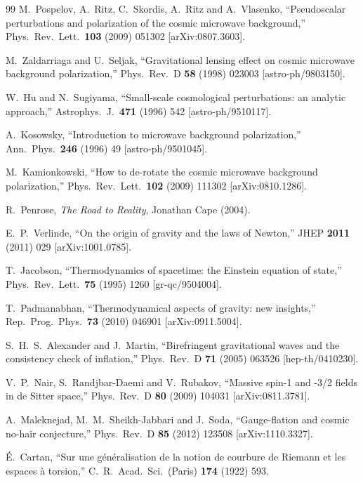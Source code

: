 \documentclass[12pt]{article}
\theoremstyle{definition}
\begin{document}
\begin{thebibliography}{99}
M.~Pospelov, A.~Ritz, C.~Skordis, A.~Ritz and A.~Vlasenko,
``Pseudoscalar perturbations and polarization of the cosmic microwave
background,''
Phys.\ Rev.\ Lett.\ \textbf{103} (2009) 051302 [arXiv:0807.3603].

M.~Zaldarriaga and U.~Seljak,
``Gravitational lensing effect on cosmic microwave background polarization,''
Phys.\ Rev.\ D \textbf{58} (1998) 023003 [astro-ph/9803150].

W.~Hu and N.~Sugiyama,
``Small-scale cosmological perturbations: an analytic approach,''
Astrophys.\ J.\ \textbf{471} (1996) 542 [astro-ph/9510117].

A.~Kosowsky,
``Introduction to microwave background polarization,''
Ann.\ Phys.\ \textbf{246} (1996) 49 [astro-ph/9501045].

M.~Kamionkowski,
``How to de-rotate the cosmic microwave background polarization,''
Phys.\ Rev.\ Lett.\ \textbf{102} (2009) 111302 [arXiv:0810.1286].

R.~Penrose,
\textit{The Road to Reality},
Jonathan Cape (2004).

E.~P.~Verlinde,
``On the origin of gravity and the laws of Newton,''
JHEP \textbf{2011} (2011) 029 [arXiv:1001.0785].

T.~Jacobson,
``Thermodynamics of spacetime: the Einstein equation of state,''
Phys.\ Rev.\ Lett.\ \textbf{75} (1995) 1260 [gr-qc/9504004].

T.~Padmanabhan,
``Thermodynamical aspects of gravity: new insights,''
Rep.\ Prog.\ Phys.\ \textbf{73} (2010) 046901 [arXiv:0911.5004].

S.~H.~S.~Alexander and J.~Martin,
``Birefringent gravitational waves and the consistency check of inflation,''
Phys.\ Rev.\ D \textbf{71} (2005) 063526 [hep-th/0410230].

V.~P.~Nair, S.~Randjbar-Daemi and V.~Rubakov,
``Massive spin-1 and -3/2 fields in de Sitter space,''
Phys.\ Rev.\ D \textbf{80} (2009) 104031 [arXiv:0811.3781].

A.~Maleknejad, M.~M.~Sheikh-Jabbari and J.~Soda,
``Gauge-flation and cosmic no-hair conjecture,''
Phys.\ Rev.\ D \textbf{85} (2012) 123508 [arXiv:1110.3327].

\'{E}.~Cartan,
``Sur une g\'en\'eralisation de la notion de courbure de Riemann et les
espaces \`a torsion,''
C.\ R.\ Acad.\ Sci.\ (Paris) \textbf{174} (1922) 593.


\end{thebibliography}
\end{document}
